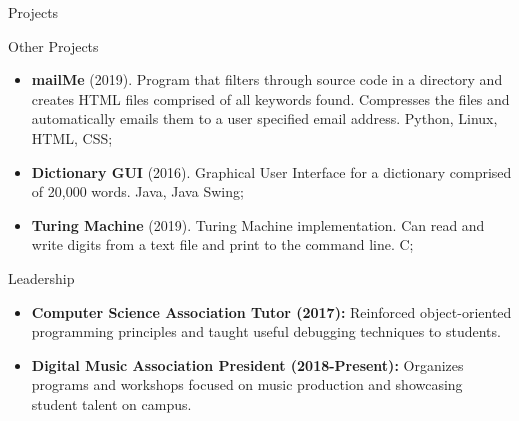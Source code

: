 \documentclass[]{johnsoncv}
\begin{document}
\begin{cvsection}{Projects}
		\begin{cvsubsection}{Other Projects}{}{}
			\begin{itemize}
				\item \textbf{mailMe} (2019). Program that filters through source code in a directory and creates HTML files comprised of all keywords found. Compresses the files and automatically emails them to a user specified email address. Python, Linux, HTML, CSS;
				\item \textbf{Dictionary GUI} (2016). Graphical User Interface for a dictionary comprised of 20,000 words. Java, Java Swing;
				\item \textbf{Turing Machine} (2019). Turing Machine implementation. Can read and write digits from a text file and print to the command line. C;

			\end{itemize}
		\end{cvsubsection}
	\end{cvsection}
	
	\begin{cvsection}{Leadership}
		\begin{cvsubsection}{}{}{}	
			\begin{itemize}
				\item \textbf{Computer Science Association Tutor (2017):} Reinforced object-oriented programming principles and taught useful debugging techniques to students.
				\item \textbf{Digital Music Association President (2018-Present):} Organizes programs and workshops focused on music production and showcasing student talent on campus.
			\end{itemize}
		\end{cvsubsection}
	\end{cvsection}


	
	
	
\end{document}

